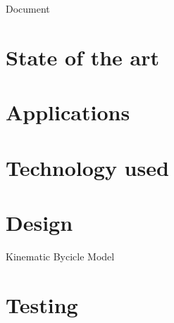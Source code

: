 \documentclass{article}
\begin{document}
\setlength{\parindent}{0in}

\begin {center}
\large Document
\end{center}

\section{State of the art}

\section{Applications}

\section{Technology used}

\section{Design}
\par Kinematic Bycicle Model

\section{Testing}
\end{document}

